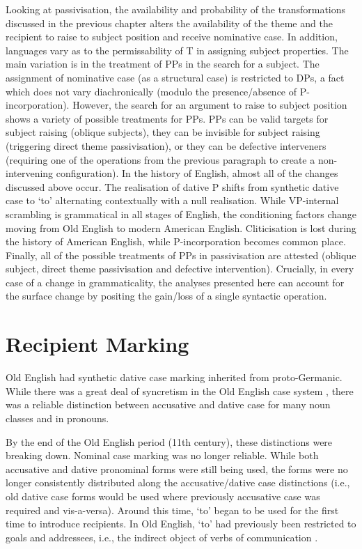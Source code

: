 	Looking at passivisation, the availability and probability of the transformations discussed in the previous chapter alters the availability of the theme and the recipient to raise to subject position and receive nominative case. In addition, languages vary as to the permissability of T in assigning subject properties. The main variation is in the treatment of PPs in the search for a subject. The assignment of nominative case (as a structural case) is restricted to DPs, a fact which does not vary diachronically (modulo the presence/absence of P-incorporation). However, the search for an argument to raise to subject position shows a variety of possible treatments for PPs. PPs can be valid targets for subject raising (oblique subjects), they can be invisible for subject raising (triggering direct theme passivisation), or they can be defective interveners (requiring one of the operations from the previous paragraph to create a non-intervening configuration).
	In the history of English, almost all of the changes discussed above occur. The realisation of dative P shifts from synthetic dative case to `to' alternating contextually with a null realisation. While VP-internal scrambling is grammatical in all stages of English, the conditioning factors change moving from Old English to modern American English. Cliticisation is lost during the history of American English, while P-incorporation becomes common place. Finally, all of the possible treatments of PPs in passivisation are attested (oblique subject, direct theme passivisation and defective intervention). Crucially, in every case of a change in grammaticality, the analyses presented here can account for the surface change by positing the gain/loss of a single syntactic operation.
\section{Recipient Marking}
	Old English had synthetic dative case marking inherited from proto-Germanic. While there was a great deal of syncretism in the Old English case system \citep{Allen.1999}, there was a reliable distinction between accusative and dative case for many noun classes and in pronouns.

	By the end of the Old English period (11th century), these distinctions were breaking down. Nominal case marking was no longer reliable. While both accusative and dative pronominal forms were still being used, the forms were no longer consistently distributed along the accusative/dative case distinctions (i.e., old dative case forms would be used where previously accusative case was required and vis-a-versa). Around this time, `to' began to be used for the first time to introduce recipients. In Old English, `to' had previously been restricted to goals and addressees, i.e., the indirect object of verbs of communication \citep{Allen.1999,McFadden.2002,OED.2013}. 

